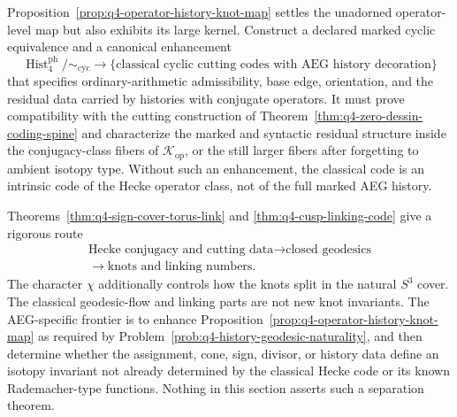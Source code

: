 \begin{problem}
\label{prob:q4-history-geodesic-naturality}
Proposition~\ref{prop:q4-operator-history-knot-map} settles the unadorned
operator-level map but also exhibits its large kernel.  Construct a declared
marked cyclic equivalence and a canonical enhancement
\[
 \operatorname{Hist}_{4}^{\mathrm{ph}}/\mathord{\sim}_{\mathrm{cyc}}
 \longrightarrow
 \{\text{classical cyclic cutting codes with AEG history decoration}\}
\]
that specifies ordinary-arithmetic admissibility, base edge, orientation, and
the residual data carried by histories with conjugate operators.  It must prove
compatibility with the cutting construction of
Theorem~\ref{thm:q4-zero-dessin-coding-spine} and characterize the marked and
syntactic residual structure inside the conjugacy-class fibers of
\(\mathcal K_{\mathrm{op}}\), or the still larger fibers after forgetting to
ambient isotopy type.  Without such an enhancement, the classical code
is an intrinsic code of the Hecke operator class, not of the full marked AEG
history.
\end{problem}

\begin{remark}
Theorems~\ref{thm:q4-sign-cover-torus-link} and
\ref{thm:q4-cusp-linking-code} give a rigorous route
\[
 \begin{gathered}
 \text{Hecke conjugacy and cutting data}
 \longrightarrow \text{closed geodesics}\\
 \longrightarrow \text{knots and linking numbers}.
 \end{gathered}
\]
The character \(\chi\) additionally controls how the knots split in the natural
\(S^3\) cover.  The classical geodesic-flow and linking parts are not new knot
invariants.  The AEG-specific frontier is to enhance
Proposition~\ref{prop:q4-operator-history-knot-map} as required by
Problem~\ref{prob:q4-history-geodesic-naturality}, and then determine whether the
assignment, cone, sign, divisor, or history data define an isotopy invariant not
already determined by the classical Hecke code or its known Rademacher-type
functions.  Nothing in this section asserts such a separation theorem.
\end{remark}
